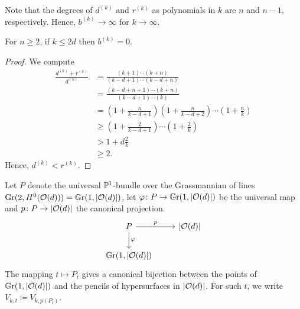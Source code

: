 \begin{remark}
	Note that the degrees of $d^{(k)}$ and $r^{(k)}$ as polynomials in $k$ are $n$ and $n-1$, respectively. Hence, $b^{(k)} \to \infty$ for $k \to \infty$.
\end{remark}

\begin{proposition} \label{zeroes-appear-in-generic-type}
	For $n\geq 2$, if $k\leq 2d$ then $b^{(k)}=0$.
\end{proposition}
\begin{proof} 
	We compute
	\begin{align*}
		\frac{d^{(k)}+r^{(k)}}{d^{(k)}} &=
		\frac{(k+1)\dotsm(k+n)}{(k-d+1)\dotsm(k-d+n)} \\ &=
		\frac{(k-d+n+1)\dotsm(k+n)}{(k-d+1)\dotsm(k)} \\ &=
		(1+\frac{n}{k-d+1})(1+\frac{n}{k-d+2})\dotsm(1+\frac{n}{k})
		\\ &\geq (1+\frac{2}{k-d+1})\dotsm(1+\frac{2}{k})
		\\ &> 1+d\frac{2}{k} 
		\\ &\geq 2.
	\end{align*}
	Hence, $d^{(k)}<r^{(k)}$.
\end{proof}

\begin{definition}
Let $P$ denote the universal $\mathbb{P}^1$-bundle over the Grassmannian of lines $\operatorname{Gr}(2,H^0(\mathcal{O}(d))) = \mathbb G \mathrm r(1,\lvert\mathcal{O}(d)\rvert)$, let $\varphi\colon P\to \mathbb G \mathrm r(1,\lvert\mathcal{O}(d)\rvert)$ be the universal map and $p\colon P\to \lvert\mathcal{O}(d)\rvert$ the canonical projection.
\[
\begin{tikzcd} [ampersand replacement = \&]
P \arrow{r}{p} \arrow{d}{\phi}\& \schemeofsurfaces \\
\GGr(1,\schemeofsurfaces) \& 
\end{tikzcd}
\]
The mapping $t\mapsto P_t$ gives a canonical bijection between the points of $\mathbb G \mathrm r(1,\lvert\mathcal{O}(d)\rvert)$ and the pencils of hypersurfaces in $\lvert\mathcal{O}(d)\rvert$. For such $t$, we write $V_{k,t} \coloneqq V_{k,p(P_t)}$.
\end{definition}
